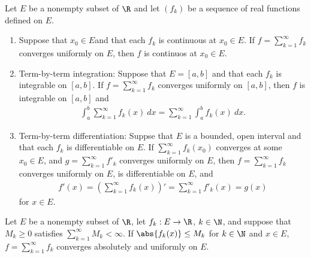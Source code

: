 \documentclass{article}
\begin{document}
\begin{theorem}
    Let $E$ be a nonempty subset of $\R$ and let $(f_k)$ be a sequence of real functions defined on $E$.
    \begin{enumerate}
        \item Suppose that $x_0\in E$and that each $f_k$ is continuous at $x_0\in E$. 
            If $f=\sum_{k=1}^\infty f_k$ converges uniformly on $E$, then $f$ is continuos at $x_0\in E$.
        \item Term-by-term integration: Suppose that $E=[a,b]$ and that each $f_k$ is integrable on $[a,b]$.
            If $f=\sum_{k=1}^\infty f_k$ converges uniformly on $[a,b]$, then $f$ is integrable on $[a,b]$
            and \begin{align*}
                \int_a^b \sum_{k=1}^\infty f_k(x)\:dx = \sum_{k=1}^\infty \int_a^b f_k(x)\:dx.
            \end{align*}
        \item Term-by-term differentiation: Suppse that $E$ is a bounded, open interval and that each 
            $f_k$ is differentiable on $E$. If $\sum_{k=1}^\infty f_k(x_0)$ converges at some $x_0\in E$,
            and $g=\sum_{k=1}^\infty f'_k$ converges uniformly on $E$, then $f=\sum_{k=1}^\infty f_k$ 
            converges uniformly on $E$, is differentiable on $E$, and \begin{align*}
                f'(x) = \left(\sum_{k=1}^\infty f_k(x)\right)' = \sum_{k=1}^\infty f'_k(x)= g(x) 
            \end{align*}
            for $x\in E$.
    \end{enumerate}
\end{theorem}

\begin{theorem}
    Let $E$ be a nonempty subset of $\R$, let $f_k:E\to\R$, $k\in\N$, and suppose that $M_k\geq 0$
    satisfies $\sum_{k=1}^\infty M_k<\infty$. If $\abs{f_k(x)}\leq M_k$ for $k\in\N$ and $x\in E$,
    $f=\sum_{k=1}^\infty f_k$ converges absolutely and uniformly on $E$.
\end{theorem}
\end{document}
